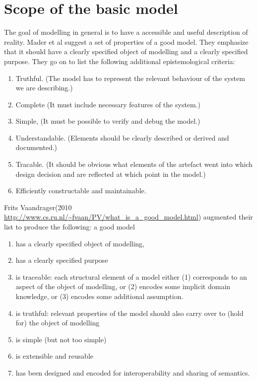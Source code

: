 \chapter{Scope of the basic model}
The goal of modelling in general is to have a accessible and useful description of reality.  Mader et al \cite{maderConstructionVerificationModels2007} suggest a set of properties of a good model. They emphasize that it should have a clearly specified object of modelling and  a clearly specified purpose. They go on to list the  following additional epistemological criteria:
\begin{enumerate}   
\item  Truthful. (The model has to represent the relevant behaviour of the system we are describing.) 
\item  Complete (It must include necessary features of the system.)
\item Simple,  (It must be possible to verify and debug the model.)
\item Understandable. (Elements should be clearly described or derived and documented.)
\item  Tracable.  (It should be obvious what elements of the artefact went into which design decision and are reflected at which point in the model.)
\item  Efficiently constructable and maintainable. 
\end{enumerate}

Frits Vaandrager(2010 \url{http://www.cs.ru.nl/~fvaan/PV/what_is_a_good_model.html})   augmented their list to produce the following: a good model \begin{enumerate}
     \item has a clearly specified object of modelling,
     \item  has a clearly specified purpose
     \item is traceable: each structural element of a model either (1) corresponds to an aspect of the object of modelling, or (2) encodes some implicit domain knowledge, or (3) encodes some additional assumption.
     \item  is truthful: relevant properties of the model should also carry over to (hold for) the object of modelling
     \item is simple (but not too simple)
     \item is extensible and reusable
     \item has been designed and encoded for interoperability and sharing of semantics.
 \end{enumerate}


